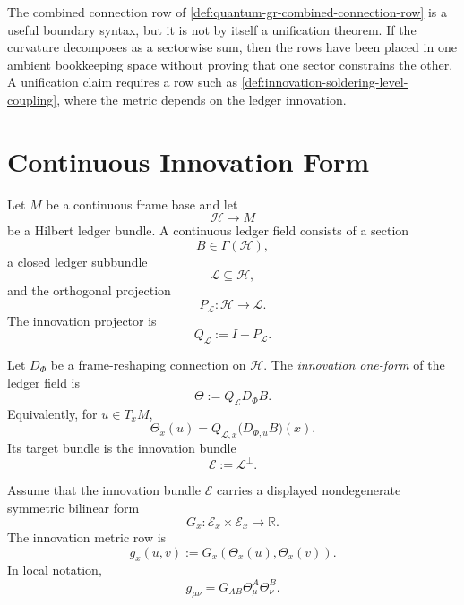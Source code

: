 \begin{principle}
\label{prin:innovation-soldering-product-connection-boundary-row}
The combined connection row of
\autoref{def:quantum-gr-combined-connection-row} is a useful boundary
syntax, but it is not by itself a unification theorem. If the curvature
decomposes as a sectorwise sum, then the rows have been placed in one
ambient bookkeeping space without proving that one sector constrains the
other. A unification claim requires a row such as
\autoref{def:innovation-soldering-level-coupling}, where the metric
depends on the ledger innovation.
\end{principle}

\section{Continuous Innovation Form}
\label{sec:innovation-soldering-continuous-form}

\begin{definition}
\label{def:innovation-soldering-continuous-ledger-field}
Let $M$ be a continuous frame base and let
$$
\mathcal H\to M
$$
be a Hilbert ledger bundle. A continuous ledger field consists of a
section
$$
B\in\Gamma(\mathcal H),
$$
a closed ledger subbundle
$$
\mathcal L\subseteq\mathcal H,
$$
and the orthogonal projection
$$
P_{\mathcal L}:\mathcal H\to\mathcal L.
$$
The innovation projector is
$$
Q_{\mathcal L}:=I-P_{\mathcal L}.
$$
\end{definition}

\begin{definition}
\label{def:innovation-soldering-one-form}
Let $D_{\Phi}$ be a frame-reshaping connection on $\mathcal H$. The
\emph{innovation one-form} of the ledger field is
$$
\Theta:=Q_{\mathcal L}D_{\Phi}B.
$$
Equivalently, for $u\in T_xM$,
$$
\Theta_x(u)
=
Q_{\mathcal L,x}\bigl(D_{\Phi,u}B\bigr)(x).
$$
Its target bundle is the innovation bundle
$$
\mathcal E:=\mathcal L^{\perp}.
$$
\end{definition}

\begin{definition}
\label{def:innovation-soldering-metric-row}
Assume that the innovation bundle $\mathcal E$ carries a displayed
nondegenerate symmetric bilinear form
$$
G_x:\mathcal E_x\times\mathcal E_x\to\mathbb R.
$$
The innovation metric row is
$$
g_x(u,v):=G_x(\Theta_x(u),\Theta_x(v)).
$$
In local notation,
$$
g_{\mu\nu}=G_{AB}\Theta^A_{\mu}\Theta^B_{\nu}.
$$
\end{definition}


